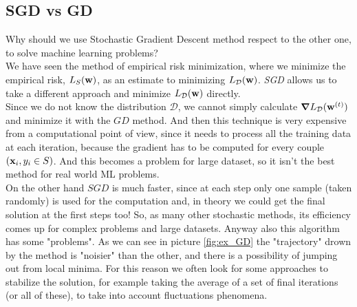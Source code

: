 \documentclass[12pt]{report}
\theoremstyle{plain}
\newcommand\mcl[1]{\mathcal{#1}}
\begin{document}
\begin{flushleft}
\subsection{SGD vs GD}
Why should we use Stochastic Gradient Descent method respect to the other one, to solve machine learning problems?\\
We have seen the method of empirical risk minimization, where we minimize the
empirical risk, $L_S(\vb{w})$, as an estimate to minimizing $L_\mcl{D}(\vb{w})$. \textit{SGD} allows us to take a different approach and minimize $L_\mcl{D}(\vb{w})$ directly.\\
Since we do not know the distribution $\mcl{D}$, we cannot simply calculate $\grad{L_\mcl{D}}(\vb{w}^{(t)})$ and minimize it with the $GD$ method. And then this technique is very expensive from a computational point of view, since it needs to process all the training data at each iteration, because the gradient has to be computed for every couple $(\vb{x}_i,y_i\in S)$. And this becomes a problem for large dataset, so it isn't the best method for real world ML problems.\\
On the other hand $SGD$ is much faster, since at each step only one sample (taken randomly) is used for the computation and, in theory we could get the final solution at the first steps too! So, as many other stochastic methods, its efficiency comes up for complex problems and large datasets. Anyway also this algorithm has some "problems". As we can see in picture \ref{fig:ex_GD} the "trajectory" drown by the method is "noisier" than the other, and there is a possibility of jumping out from local minima. For this reason we often look for some approaches to stabilize the solution, for example taking the average of a set of final iterations (or all of these), to take into account fluctuations phenomena.\\


\end{flushleft}
\end{document}
